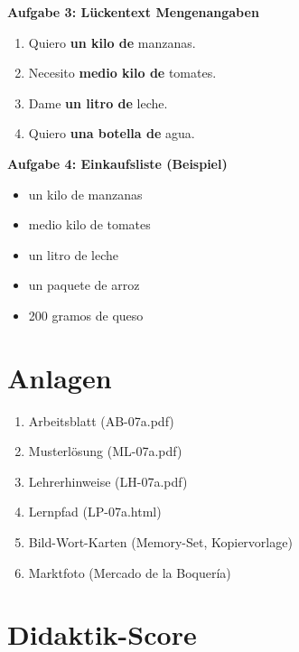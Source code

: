 \documentclass[11pt,a4paper]{article}
\begin{document}
\textbf{Aufgabe 3: Lückentext Mengenangaben}
\begin{enumerate}[label=\alph*)]
    \item Quiero \textbf{un kilo de} manzanas.
    \item Necesito \textbf{medio kilo de} tomates.
    \item Dame \textbf{un litro de} leche.
    \item Quiero \textbf{una botella de} agua.
\end{enumerate}

\textbf{Aufgabe 4: Einkaufsliste (Beispiel)}
\begin{itemize}
    \item un kilo de manzanas
    \item medio kilo de tomates
    \item un litro de leche
    \item un paquete de arroz
    \item 200 gramos de queso
\end{itemize}

\section{Anlagen}

\begin{enumerate}
    \item Arbeitsblatt (AB-07a.pdf)
    \item Musterlösung (ML-07a.pdf)
    \item Lehrerhinweise (LH-07a.pdf)
    \item Lernpfad (LP-07a.html)
    \item Bild-Wort-Karten (Memory-Set, Kopiervorlage)
    \item Marktfoto (Mercado de la Boquería)
\end{enumerate}

\newpage
\section{Didaktik-Score}
\end{document}
